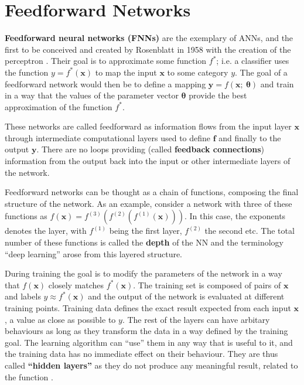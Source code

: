 



\section{Feedforward Networks}

\textbf{Feedforward neural networks (FNNs)} are the exemplary of ANNs, and the first to be
conceived and created by Rosenblatt in 1958 with the creation of the
perceptron \cite{article:Rosenblatt1958ThePA}. Their goal is to approximate
some function $f^{*}$; i.e. a classifier uses the function
$y=f^{*}(\bm{x})$ to map the input $\bm{x}$ to some category $y$. The
goal of a feedforward network would then be to define a mapping
$\bm{y} = f(\bm{x};~\bm{\theta})$ and train in a way that the values
of the parameter vector $\bm{\theta}$ provide the best approximation of
the function $f^{*}$.

These networks are called feedforward as information flows from the input layer
$\bm{x}$ through intermediate computational layers used to define $\bm{f}$ and
finally to the output $\bm{y}$. There are no loops providing (called
\textbf{feedback connections}) information from the output back into
the input or other intermediate layers of the network.

Feedforward networks can be thought as a chain of functions, composing
the final structure of the network. As an example, consider a network
with three of these functions as $f(\bm{x}) = f^{(3)}(f^{(2)}(f^{(1)}(\bm{x})))$.
In this case, the exponents denotes the layer, with $f^{(1)}$ being the first
layer, $f^{(2)}$ the second etc. The total number of these functions is called
the \textbf{depth} of the NN and the terminology ``deep learning'' arose from
this layered structure.

During training the goal is to modify the parameters of the
network in a way that $f(\bm{x})$ closely matches $f^*(\bm{x})$. The training
set is composed of pairs of $\bm{x}$ and labels $y \approx f^*(\bm{x})$ and
the output of the network is evaluated at different training points. Training
data defines the exact result expected from each input $\bm{x}$, a value as close
as possible to $y$. The rest of the layers can have arbitary behaviours as long
as they transform the data in a way defined by the training goal. The
learning algorithm can ``use'' them in any way that is useful to it, and
the training data has no immediate effect on their behaviour. They are
thus called \textbf{``hidden layers''} as they do not produce any
meaningful result, related to the function \cite[p.~160]{book:Goodfellow}. 


